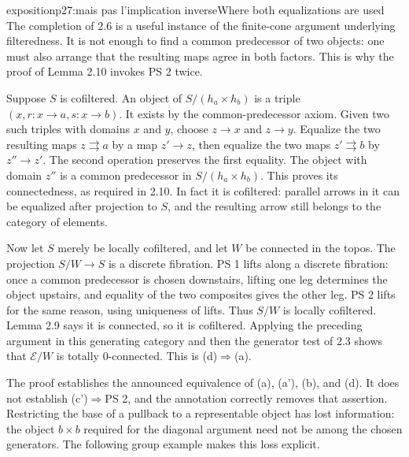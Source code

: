\begin{dcomment}{exposition}{p27:mais pas l'implication inverse}{Where both equalizations are used}
The completion of 2.6 is a useful instance of the finite-cone argument underlying filteredness. It is not enough to find a common predecessor of two objects: one must also arrange that the resulting maps agree in both factors. This is why the proof of Lemma 2.10 invokes PS 2 twice.

Suppose $S$ is cofiltered. An object of $S/(h_a\times h_b)$ is a triple $(x,r:x\to a,s:x\to b)$. It exists by the common-predecessor axiom. Given two such triples with domains $x$ and $y$, choose $z\to x$ and $z\to y$. Equalize the two resulting maps $z\rightrightarrows a$ by a map $z'\to z$, then equalize the two maps $z'\rightrightarrows b$ by $z''\to z'$. The second operation preserves the first equality. The object with domain $z''$ is a common predecessor in $S/(h_a\times h_b)$. This proves its connectedness, as required in 2.10. In fact it is cofiltered: parallel arrows in it can be equalized after projection to $S$, and the resulting arrow still belongs to the category of elements.

Now let $S$ merely be locally cofiltered, and let $W$ be connected in the topos. The projection $S/W\to S$ is a discrete fibration. PS 1 lifts along a discrete fibration: once a common predecessor is chosen downstairs, lifting one leg determines the object upstairs, and equality of the two composites gives the other leg. PS 2 lifts for the same reason, using uniqueness of lifts. Thus $S/W$ is locally cofiltered. Lemma 2.9 says it is connected, so it is cofiltered. Applying the preceding argument in this generating category and then the generator test of 2.3 shows that $\mathcal E/W$ is totally $0$-connected. This is (d)$\Rightarrow$(a).

The proof establishes the announced equivalence of (a), (a'), (b), and (d). It does not establish (c')$\Rightarrow$PS 2, and the annotation correctly removes that assertion. Restricting the base of a pullback to a representable object has lost information: the object $b\times b$ required for the diagonal argument need not be among the chosen generators. The following group example makes this loss explicit.
\end{dcomment}

